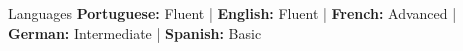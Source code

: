 \begin{rubric}{Languages}
  \entry* \textbf{Portuguese:} Fluent | \textbf{English:} Fluent | \textbf{French:} Advanced | \textbf{German:} Intermediate | \textbf{Spanish:} Basic
\end{rubric}
